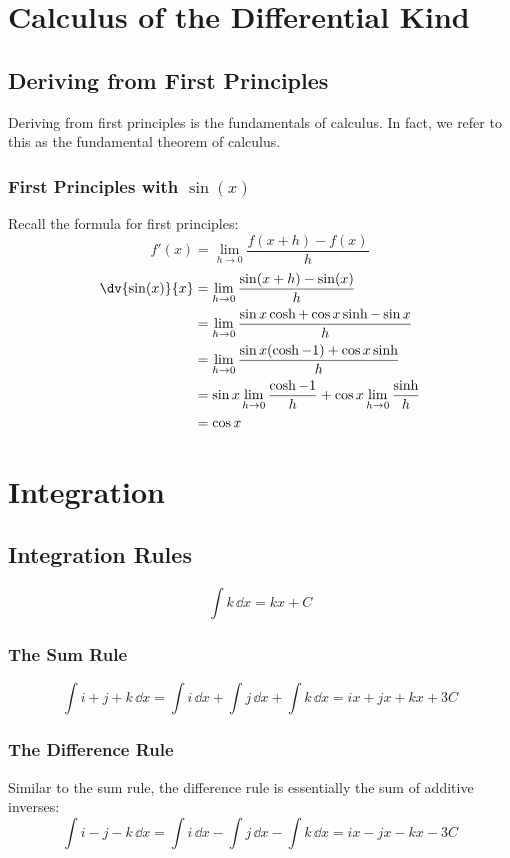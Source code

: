 \documentclass[a4paper]{article}
\theoremstyle{plain}
\theoremstyle{definition}
\theoremstyle{remark}
\newcommand{\sectionSpace}{\vspace{2em}} %
\begin{document}
\sectionSpace
\section{Calculus of the Differential Kind}
    \subsection{Deriving from First Principles}
    Deriving from first principles is the fundamentals of calculus. In fact, we refer to this as the fundamental theorem of calculus.

        \subsubsection{First Principles with \texorpdfstring{$\sin(x)$}{sin(x)}}
        Recall the formula for first principles:
        \[f'(x) = \lim_{h \to 0} \frac{f(x+h) - f(x)}{h}\]
        \begin{align}
            \dv{\sin(x)}{x} & = \lim_{h \to 0} \frac{\sin(x+h) - \sin(x)}{h} \\
            & = \lim_{h \to 0} \frac{\sin{x}\cosh + \cos{x}\sinh - \sin{x}}{h} \\
            & = \lim_{h \to 0} \frac{\sin{x}(\cosh - 1) + \cos{x}\sinh}{h} \\
            & = \sin{x}\lim_{h \to 0}\frac{\cosh - 1}{h} + \cos{x}\lim_{h \to 0} \frac{\sinh}{h} \\
            & = \cos{x}
        \end{align}


\sectionSpace
\section{Integration}
    \subsection{Integration Rules}
    $$\int k\,\dd{x} = kx + C$$
        \subsubsection{The Sum Rule}
        $$\int i + j + k\,\dd{x} = \int i\,\dd{x} + \int j\,\dd{x} + \int k\,\dd{x} = ix + jx + kx + 3C$$

        \subsubsection{The Difference Rule}
        Similar to the sum rule, the difference rule is essentially the sum of additive inverses:
        $$\int i - j - k\,\dd{x} = \int i\,\dd{x} - \int j\,\dd{x} - \int k\,\dd{x} = ix - jx - kx - 3C$$
\end{document}
